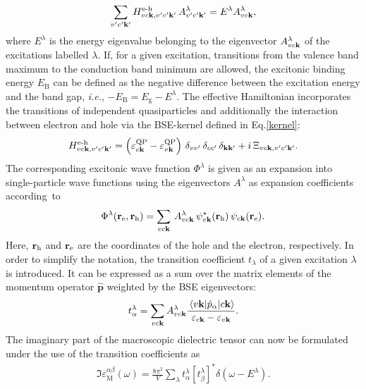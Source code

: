 %
\begin{equation}
        \sum_{v'c'\mathbf{k}'}H^\text{e-h}_{vc\mathbf{k},v'c'\mathbf{k}'}\,A^\lambda_{v'c'\mathbf{k}'} = E^\lambda A^\lambda_{vc\mathbf{k}},
\end{equation}
%
where $E^\lambda$ is the energy eigenvalue belonging to the eigenvector $ A^\lambda_{vc\mathbf{k}}$  of the excitations labelled $\lambda$. If, for a given excitation, transitions from the valence band maximum to the conduction band minimum are allowed, the excitonic binding energy $E^{\phantom{l}}_\text{B}$ can be defined  as the negative difference between the excitation energy and the band gap, \textit{i.e.}, $-E_\text{B}= E_\text{g} - E^\lambda$. The effective Hamiltonian incorporates the transitions of independent quasiparticles and additionally the interaction between electron and hole via the BSE-kernel defined in Eq.\;\eqref{kernel}:
%
\begin{align}\label{effham}
    H^\text{e-h}_{vc\mathbf{k},v'c'\mathbf{k}'} = \left(\varepsilon^\text{QP}_{c\mathbf{k}} - \varepsilon^\text{QP}_{v\mathbf{k}}\right)\,\delta_{vv'}\,\delta_{cc'}\,\delta_{\mathbf{kk'}} + i\,\Xi_{vc\mathbf{k},v'c'\mathbf{k}'}.
\end{align}
%
The corresponding excitonic wave function $\Phi^\lambda$ is given as an expansion into single-particle wave functions using the eigenvectors $A^\lambda$ as expansion coefficients according~to 
%
\begin{equation}\label{eh_wf_expansion}
    \Phi^\lambda(\mathbf{r}_\text{e},\mathbf{r}_\text{h}) = \sum_{vc\mathbf{k}}\,A^\lambda_{vc\mathbf{k}}\,\psi^*_{v\mathbf{k}}(\mathbf{r}_\text{h})\,\psi_{c\mathbf{k}}(\mathbf{r}_\text{e}).
\end{equation}
%
\newpage
Here, $\mathbf{r}_\text{h}$ and $\mathbf{r}_\text{e}$ are the coordinates of the hole and the electron, respectively. In order to simplify the notation, the transition coefficient $t_\lambda$ of a given excitation $\lambda$ is introduced. It can be expressed as a sum over the matrix elements of the momentum operator $\hat{\mathbf{p}}$ weighted by the BSE eigenvectors: 
%
\begin{align}
    t^\lambda_\alpha = \sum_{vc\mathbf{k}}A^\lambda_{vc\mathbf{k}}\frac{\mel{v\mathbf{k}}{\hat{p}_\alpha}{c\mathbf{k}}}{\varepsilon_{c\mathbf{k}} - \varepsilon_{v\mathbf{k}}}.
\end{align}
%
The imaginary part of the macroscopic dielectric tensor can now be formulated under the use of the transition coefficients as
%
\begin{align}\label{diel_bse}
    \Im \varepsilon^{\alpha\beta}_\text{M}(\omega) = \frac{8\pi^2}{V}\sum_\lambda t^\lambda_\alpha \left[t^\lambda_\beta\right]^* \delta(\omega-E^\lambda).
\end{align}
%
